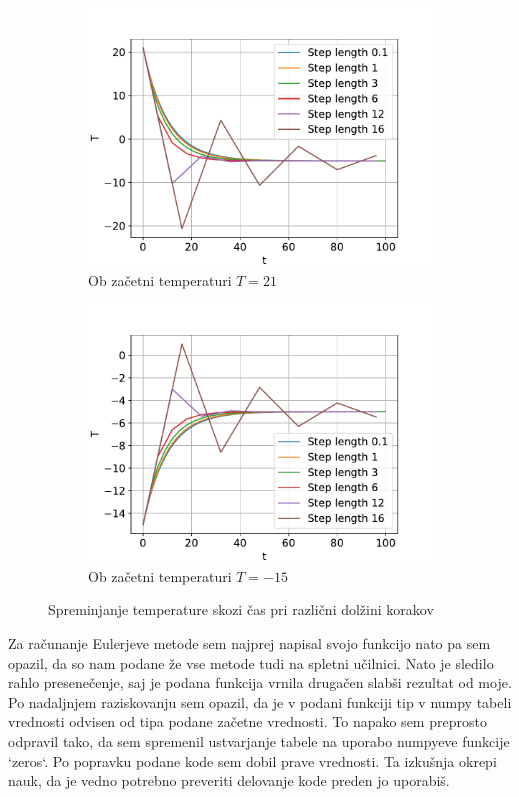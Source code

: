 \documentclass{article}
\begin{document}
\begin{figure}[H]
    \centering
    \begin{subfigure}{0.49\textwidth}
        \centering
        \includegraphics[width=\linewidth]{euler21.pdf}
        \caption{Ob začetni temperaturi $T=21$}
        \label{fig:image1}
    \end{subfigure}
    \hfill
    \begin{subfigure}{0.49\textwidth}
        \centering
        \includegraphics[width=\linewidth]{euler-15.pdf}
        \caption{Ob začetni temperaturi $T=-15$}
        \label{fig:image2}
    \end{subfigure}
	\caption{Spreminjanje temperature skozi čas pri različni dolžini korakov}
\end{figure}
Za računanje Eulerjeve metode sem najprej napisal svojo funkcijo nato pa sem opazil, da so nam podane že vse metode tudi na spletni učilnici. Nato je sledilo rahlo presenečenje, saj je podana funkcija vrnila drugačen slabši rezultat od moje. Po nadaljnjem raziskovanju sem opazil, da je v podani funkciji tip v numpy tabeli vrednosti odvisen od tipa podane začetne vrednosti. To napako sem preprosto odpravil tako, da sem spremenil ustvarjanje tabele na uporabo numpyeve funkcije `zeros`. Po popravku podane kode sem dobil prave vrednosti. Ta izkušnja okrepi nauk, da je vedno potrebno preveriti delovanje kode preden jo uporabiš. 
\newpage
\end{document}
